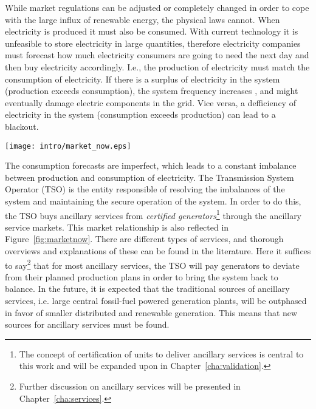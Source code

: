 While market regulations can be adjusted or completely changed in order to cope with the large influx of renewable energy, the physical laws cannot.
When electricity is produced it must also be consumed. With current technology it is unfeasible to store electricity in large quantities, therefore electricity companies must forecast how much electricity consumers are going to need the next day and then buy electricity accordingly. I.e., the production of electricity must match the consumption of electricity. If there is a surplus of electricity in the system (production exceeds consumption), the system frequency increases%
, and might eventually damage electric components in the grid. Vice versa, a defficiency of electricity in the system (consumption exceeds production) can lead to a blackout. 
\begin{figure*}[htbp!]
		\centering
		\caption{The actors and relationships in the power market today. Note that the consumer buys electricity from a retailer, but has no further contact to the other market actors, i.e. the consumer has a passive role in the system.}\label{fig:marketnow}
	\texttt{[image: intro/market\_now.eps]}
\end{figure*}

The consumption forecasts are imperfect, which leads to a constant imbalance between production and consumption of electricity. The Transmission System Operator (TSO) is the entity responsible of resolving the imbalances of the system and maintaining the secure operation of the system. In order to do this, the TSO buys ancillary services from \emph{certified generators}\footnote[][-2\baselineskip]{The concept of certification of units to deliver ancillary services is central to this work and will be expanded upon in Chapter~\ref{cha:validation}.}  through the ancillary service markets. This market relationship is also reflected in Figure~\ref{fig:marketnow}. There are different types of services, and thorough overviews and explanations of these can be found in the literature. Here it suffices to say\footnote{Further discussion on ancillary services will be presented in Chapter~\ref{cha:services}.} that for most ancillary services, the TSO will pay generators to deviate from their planned production plans in order to bring the system back to balance. In the future, it is expected that the traditional sources of ancillary services, i.e. large central fossil-fuel powered generation plants, will be outphased in favor of smaller distributed and renewable generation. This means that new sources for ancillary services must be found.  
